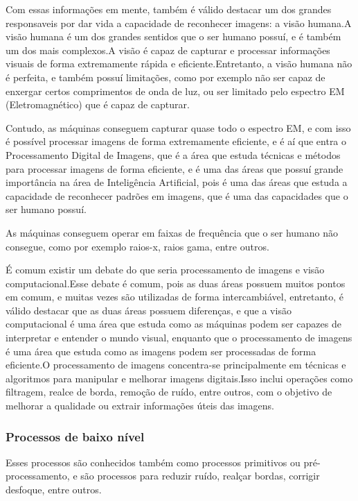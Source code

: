 \documentclass[12pt]{article}
\begin{document}
Com essas informações em mente, também é válido destacar um dos grandes responsaveis por dar vida a
capacidade de reconhecer imagens: a visão humana.A visão humana é um dos grandes sentidos que o ser
humano possuí, e é também um dos mais complexos.A visão é capaz de capturar e processar
informações visuais de forma extremamente rápida e eficiente.Entretanto, a visão humana não é perfeita, e
também possuí limitações, como por exemplo não ser capaz de enxergar certos comprimentos de onda de
luz, ou ser limitado pelo espectro EM (Eletromagnético) que é capaz de capturar.

Contudo, as máquinas conseguem capturar quase todo o espectro EM, e com isso é possível processar
imagens de forma extremamente eficiente, e é aí que entra o Processamento Digital de Imagens, que é a
área que estuda técnicas e métodos para processar imagens de forma eficiente, e é uma das áreas que
possuí grande importância na área de Inteligência Artificial, pois é uma das áreas que estuda a
capacidade de reconhecer padrões em imagens, que é uma das capacidades que o ser humano possuí.

As máquinas conseguem operar em faixas de frequência que o ser humano não consegue, como por exemplo
raios-x, raios gama, entre outros.

É comum existir um debate do que seria processamento de imagens e visão computacional.Esse debate é
comum, pois as duas áreas possuem muitos pontos em comum, e muitas vezes são utilizadas de forma
intercambiável, entretanto, é válido destacar que as duas áreas possuem diferenças, e que a visão
computacional é uma área que estuda como as máquinas podem ser capazes de interpretar e entender o
mundo visual, enquanto que o processamento de imagens é uma área que estuda como as imagens podem ser
processadas de forma eficiente.O processamento de imagens concentra-se principalmente em técnicas e algoritmos para manipular e
melhorar imagens digitais.Isso inclui operações como filtragem, realce de borda, remoção de ruído,
entre outros, com o objetivo de melhorar a qualidade ou extrair informações úteis das imagens.


 \subsubsection[Processos de baixo nível]{Processos de baixo nível}
Esses processos são conhecidos também como processos primitivos ou pré-processamento, e são processos
para reduzir ruído, realçar bordas, corrigir desfoque, entre outros.
\end{document}
